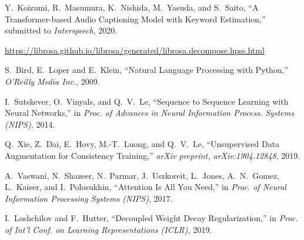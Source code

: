 \documentclass{article}
\begin{document}
\begin{sloppy}
\begin{thebibliography}{99}
 Y.\ Koizumi, R.\ Masumura, K.\ Nishida, M.\ Yasuda, and S.\ Saito,
``A Transformer-based Audio Captioning Model with Keyword Estimation,''
submitted to 
\textit{Interspeech}, 2020.


 \url{https://librosa.github.io/librosa/generated/librosa.decompose.hpss.html}

 S.\ Bird, E.\ Loper and E.\ Klein,
``Natural Language Processing with Python,''
\textit{O'Reilly Media Inc.}, 2009.

 I.\ Sutskever, O.\ Vinyals, and Q.\ V.\ Le,
``Sequence to Sequence Learning with Neural Networks,''
in \textit{Proc. of Advances in Neural Information Process. Systems (NIPS),} 2014.

Q.\ Xie, Z.\ Dai, E.\ Hovy, M.-T.\ Luong, and Q.\ V.\ Le,
``Unsupervised Data Augmentation for Consistency Training,''
\textit{arXiv preprint, arXiv:1904.12848}, 2019. 

A.\ Vaswani, N.\ Shazeer, N.\ Parmar, J.\ Uszkoreit, L.\ Jones, A.\ N.\ Gomez, L.\ Kaiser, and I.\ Polosukhin,
``Attention Is All You Need,''
in \textit{Proc. of Neural Information Processing Systems (NIPS)}, 2017.


 I.\ Loshchilov and F.\ Hutter,
``Decoupled Weight Decay Regularization,''
in \textit{Proc. of Int'l Conf. on Learning Representations (ICLR),} 2019.


\end{thebibliography}
\end{sloppy}
\end{document}
